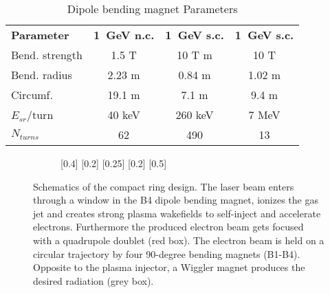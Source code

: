 \documentclass[a4paper,
              ]{jacow}
\begin{document}
\begin{table}[hbt]
   \centering
   \caption{Dipole bending magnet Parameters}
   \begin{tabular}{lccc}
       \toprule
\textbf{Parameter} & \textbf{\SI{1}{GeV} n.c.} & \textbf{\SI{1}{GeV} s.c.} & \textbf{\SI{1}{GeV} s.c.}\\
Bend. strength & 1.5 T & 10 T m & 10 T\\
Bend. radius & 2.23 m & 0.84 m & 1.02 m\\
Circumf. & 19.1 m & 7.1 m & 9.4 m\\
$E_{sr}$/turn & 40 keV & 260 keV & 7 MeV\\
$N_{turns}$ & 62 & 490 & 13\\
       \bottomrule
   \end{tabular}
   \label{magnets}
\end{table}

\begin{figure}
\begin{subfigure}{0.5\textwidth}
\begin{lattice}
[0.4]
  \end{lattice}
	\end{subfigure}
\caption{Schematics of the compact ring design. The laser beam enters through a window in the B4 dipole bending magnet, ionizes the gas jet and creates strong plasma wakefields to self-inject and accelerate electrons. Furthermore the produced electron beam gets focused with a quadrupole doublet (red box). The electron beam is held on a circular trajectory by four 90-degree bending magnets (B1-B4). Opposite to the plasma injector, a Wiggler magnet produces the desired radiation (grey box).}
	\label{schematics}
\end{figure}
\end{document}
